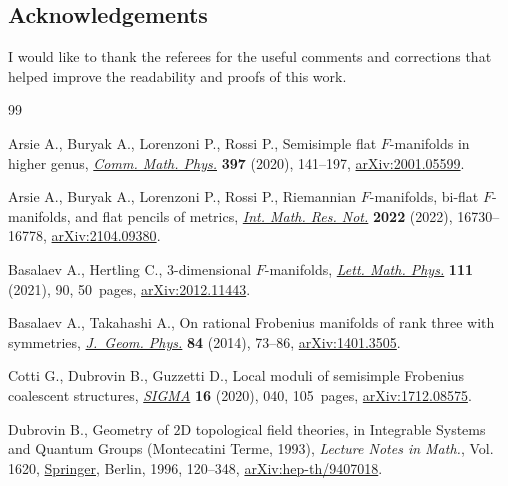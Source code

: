 \documentclass[10pt,a4paper]{amsart}
\numberwithin{equation}{section}
\begin{document}
\subsection*{Acknowledgements}
I would like to thank the referees for the useful comments and corrections that helped improve the readability and proofs of this work.


\begin{thebibliography}{99}
\footnotesize\itemsep=0pt

Arsie A., Buryak A., Lorenzoni P., Rossi P., Semisimple flat {$F$}-manifolds in
 higher genus, \href{https://doi.org/10.1007/s00220-022-04450-6}{\textit{Comm. Math. Phys.}} \textbf{397} (2020), 141--197,
 \href{https://arxiv.org/abs/2001.05599}{arXiv:2001.05599}.

Arsie A., Buryak A., Lorenzoni P., Rossi P., Riemannian {$F$}-manifolds, bi-flat
 {$F$}-manifolds, and flat pencils of metrics, \href{https://doi.org/10.1093/imrn/rnab203}{\textit{Int. Math. Res. Not.}}
 \textbf{2022} (2022), 16730--16778, \href{https://arxiv.org/abs/2104.09380}{arXiv:2104.09380}.

Basalaev A., Hertling C., 3-dimensional {$F$}-manifolds, \href{https://doi.org/10.1007/s11005-021-01432-y}{\textit{Lett. Math.
 Phys.}} \textbf{111} (2021), 90, 50~pages, \href{https://arxiv.org/abs/2012.11443}{arXiv:2012.11443}.

Basalaev A., Takahashi A., On rational {F}robenius manifolds of rank three with
 symmetries, \href{https://doi.org/10.1016/j.geomphys.2014.05.030}{\textit{J.~Geom. Phys.}} \textbf{84} (2014), 73--86,
 \href{https://arxiv.org/abs/1401.3505}{arXiv:1401.3505}.

Cotti G., Dubrovin B., Guzzetti D., Local moduli of semisimple {F}robenius
 coalescent structures, \href{https://doi.org/10.3842/SIGMA.2020.040}{\textit{SIGMA}} \textbf{16} (2020), 040, 105~pages,
 \href{https://arxiv.org/abs/1712.08575}{arXiv:1712.08575}.

Dubrovin B., Geometry of {$2$}{D} topological field theories, in Integrable
 {S}ystems and {Q}uantum {G}roups ({M}ontecatini {T}erme, 1993),
 \textit{Lecture Notes in Math.}, Vol. 1620, \href{https://doi.org/10.1007/BFb0094793}{Springer}, Berlin, 1996, 120--348,
 \href{https://arxiv.org/abs/hep-th/9407018}{arXiv:hep-th/9407018}.


\end{thebibliography}
\end{document}
